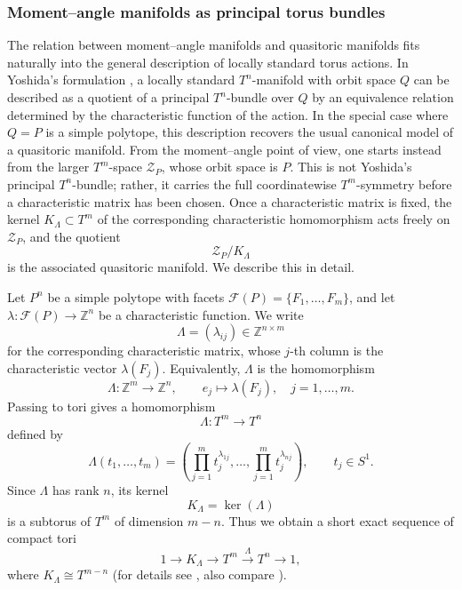 \documentclass[11pt,a4paper]{article}
\numberwithin{equation}{section}
\theoremstyle{named}
\begin{document}
\subsubsection{Moment--angle manifolds as principal torus bundles}
\label{sec:ma_principal_bundle}

The relation between moment--angle manifolds and quasitoric manifolds fits naturally into the general description of locally standard torus actions.  In Yoshida's formulation \cite{Yoshida}, a locally standard \(T^n\)-manifold with orbit space \(Q\) can be described as a quotient of a principal \(T^n\)-bundle over \(Q\) by an equivalence relation determined by the characteristic function of the action. In the special case where \(Q=P\) is a simple polytope, this description recovers the usual canonical model of a quasitoric manifold. From the moment--angle point of view, one starts instead from the larger \(T^m\)-space \(\mathcal Z_P\), whose orbit space is \(P\). This is not Yoshida's principal \(T^n\)-bundle; rather, it carries the full coordinatewise \(T^m\)-symmetry before a characteristic matrix has been chosen. Once a characteristic matrix is fixed, the kernel \(K_\Lambda\subset T^m\) of the corresponding characteristic homomorphism acts freely on \(\mathcal Z_P\), and the quotient
\[
    \mathcal Z_P/K_\Lambda
\]
is the associated quasitoric manifold. We describe this in detail.

Let \(P^n\) be a simple polytope with facets \(\mathcal F(P)=\{F_1,\ldots,F_m\}\), and let \(\lambda:\mathcal F(P)\longrightarrow \mathbb Z^n \) be a characteristic function.  We write
\[
    \Lambda=(\lambda_{ij})\in \mathbb Z^{n\times m}
\]
for the corresponding characteristic matrix, whose \(j\)-th column is the characteristic vector \(\lambda(F_j)\).  Equivalently, \(\Lambda\) is the homomorphism
\[
    \Lambda:\mathbb Z^m\longrightarrow \mathbb Z^n,
    \qquad
    e_j\longmapsto \lambda(F_j),
    \quad j=1,\ldots,m.
\]
Passing to tori gives a homomorphism
\[
    \Lambda:T^m\longrightarrow T^n
\]
defined by
\[
    \Lambda(t_1,\ldots,t_m)
    =
    \left(
    \prod_{j=1}^{m}t_j^{\lambda_{1j}},
    \ldots,
    \prod_{j=1}^{m}t_j^{\lambda_{nj}}
    \right),
    \qquad t_j\in S^1.
\]
Since \(\Lambda\) has rank \(n\), its kernel
\[
    K_\Lambda=\ker(\Lambda)
\]
is a subtorus of \(T^m\) of dimension \(m-n\).  Thus we obtain a short exact sequence of compact tori
\[
    1
    \longrightarrow
    K_\Lambda
    \longrightarrow
    T^m
    \xrightarrow{\ \Lambda\ }
    T^n
    \longrightarrow
    1,
\]
where \(K_\Lambda\cong T^{m-n}\) (for details see \cite[\S 4.8]{tt}, also compare \cite{lan}).
\end{document}
